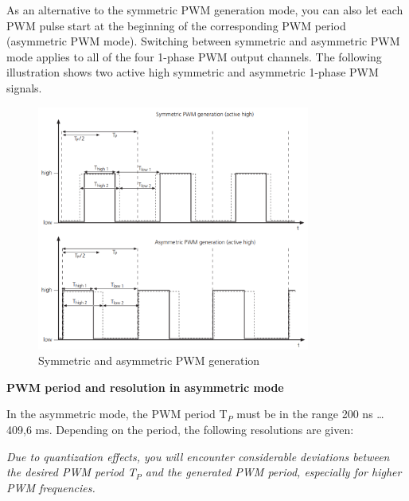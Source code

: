 As an alternative to the symmetric PWM generation mode, you can also let each PWM pulse start at the beginning of the corresponding PWM period (asymmetric PWM mode). Switching between symmetric and asymmetric PWM mode applies to all of the four 1-phase PWM output channels. The following illustration shows two active high symmetric and asymmetric 1-phase PWM signals.
\begin{figure}[H]
    \centering
    \includegraphics[width=0.8\textwidth]{Images/Symmetric and asymmetric PWM generation.png}
    \caption{Symmetric and asymmetric PWM generation}
\end{figure}

\noindent \textbf{PWM period and resolution in asymmetric mode}\par

In the asymmetric mode, the PWM period T$_P$ must be in the range 200 ns … 409,6 ms. Depending on the period, the following resolutions are given:


\noindent \textit{Due to quantization effects, you will encounter considerable deviations between the desired PWM period T$_P$ and the generated PWM period, especially for higher PWM frequencies.}

